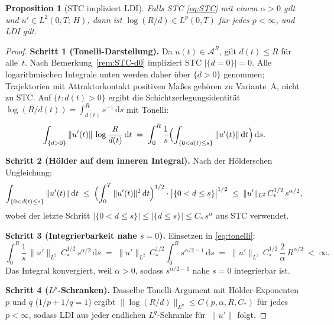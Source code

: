 \documentclass[12pt,a4paper]{article}
\theoremstyle{definition}
\theoremstyle{plain}
\newtheorem{proposition}[definition]{Proposition}
\theoremstyle{remark}
\begin{document}
\begin{proposition}[STC impliziert LDI]
\label{prop:variant-B}
Falls STC \eqref{eq:STC} mit einem $\alpha > 0$ gilt und
$u' \in L^2(0,T;\,H)$, dann ist
$\log(R/d) \in L^p(0,T)$ für jedes $p < \infty$, und LDI gilt.
\end{proposition}

\begin{proof}
\textbf{Schritt 1 (Tonelli-Darstellung).}\;
Da $u(t) \in \mathcal{A}^R$, gilt $d(t) \le R$ für alle~$t$.
Nach Bemerkung~\ref{rem:STC-d0} impliziert STC
$|\{d=0\}|=0$. Alle logarithmischen Integrale unten werden daher über
$\{d>0\}$ genommen; Trajektorien mit Attraktorkontakt positiven Maßes
gehören zu Variante~A, nicht zu STC. Auf $\{t : d(t) > 0\}$ ergibt die
Schichtzerlegungsidentität
$\log(R/d(t)) = \int_{d(t)}^{R} s^{-1}\,\mathrm{d}s$ mit Tonelli:
\begin{equation}\label{eq:tonelli}
  \int_{\{d>0\}} \|u'(t)\|\,\log\frac{R}{d(t)}\,\mathrm{d}t
  \;=\;
  \int_0^R \frac{1}{s}
  \Bigl(\int_{\{0 < d(t) \le s\}} \|u'(t)\|\,\mathrm{d}t\Bigr)
  \,\mathrm{d}s.
\end{equation}

\medskip
\noindent
\textbf{Schritt 2 (Hölder auf dem inneren Integral).}\;
Nach der Hölderschen Ungleichung:
\[
  \int_{\{0<d(t)\le s\}} \|u'(t)\|\,\mathrm{d}t
  \;\le\;
  \Bigl(\int_0^T \|u'(t)\|^2\,\mathrm{d}t\Bigr)^{1/2}
  \cdot
  \bigl|\{0 < d \le s\}\bigr|^{1/2}
  \;\le\;
  \|u'\|_{L^2}\,C_*^{1/2}\,s^{\alpha/2},
\]
wobei der letzte Schritt $|\{0<d\le s\}| \le |\{d\le s\}|
\le C_*\,s^\alpha$ aus STC verwendet.

\medskip
\noindent
\textbf{Schritt 3 (Integrierbarkeit nahe $s=0$).}\;
Einsetzen in \eqref{eq:tonelli}:
\[
  \int_0^R \frac{1}{s}\,\|u'\|_{L^2}\,C_*^{1/2}\,s^{\alpha/2}
  \,\mathrm{d}s
  \;=\;
  \|u'\|_{L^2}\,C_*^{1/2}
  \int_0^R s^{\alpha/2 - 1}\,\mathrm{d}s
  \;=\;
  \|u'\|_{L^2}\,C_*^{1/2}\,
  \frac{2}{\alpha}\,R^{\alpha/2}
  \;<\; \infty.
\]
Das Integral konvergiert, weil $\alpha > 0$, sodass
$s^{\alpha/2-1}$ nahe $s=0$ integrierbar ist.

\medskip
\noindent
\textbf{Schritt 4 ($L^p$-Schranken).}\;
Dasselbe Tonelli-Argument mit Hölder-Exponenten $p$ und $q$
($1/p + 1/q = 1$) ergibt
$\|\log(R/d)\|_{L^p} \le C(p,\alpha,R,C_*)$ für jedes
$p < \infty$, sodass LDI aus jeder endlichen $L^q$-Schranke
für~$\|u'\|$ folgt.
\end{proof}
\end{document}
